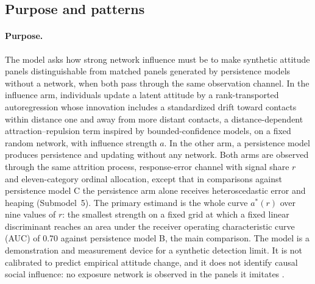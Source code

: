 \subsection{Purpose and patterns}

\paragraph{Purpose.}
The model asks how strong network influence must be to make synthetic attitude panels distinguishable from matched panels generated by persistence models without a network, when both pass through the same observation channel. In the influence arm, individuals update a latent attitude by a rank-transported autoregression whose innovation includes a standardized drift toward contacts within distance one and away from more distant contacts, a distance-dependent attraction--repulsion term inspired by bounded-confidence models, on a fixed random network, with influence strength $a$. In the other arm, a persistence model produces persistence and updating without any network. Both arms are observed through the same attrition process, response-error channel with signal share $r$ and eleven-category ordinal allocation, except that in comparisons against persistence model C the persistence arm alone receives heteroscedastic error and heaping (Submodel~5). The primary estimand is the whole curve $a^*(r)$ over nine values of $r$: the smallest strength on a fixed grid at which a fixed linear discriminant reaches an area under the receiver operating characteristic curve (AUC) of 0.70 against persistence model B, the main comparison. The model is a demonstration and measurement device for a synthetic detection limit. It is not calibrated to predict empirical attitude change, and it does not identify causal social influence: no exposure network is observed in the panels it imitates \cite{manski1993,shalizi2011}.

